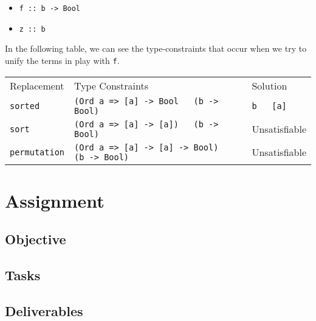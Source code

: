 \documentclass[a4paper, 11pt]{article}
\newcommand{\h}[1]{\texttt{#1}}
\begin{document}
\begin{itemize}
  \item \h{f :: b -> Bool}
  \item \h{z :: b}
\end{itemize}

In the following table, we can see the type-constraints that occur when we try to unify the terms in play with \h{f}.

\begin{tabular}{lll}
  Replacement & Type Constraints & Solution \\
  \h{sorted} & \h{(Ord a => [a] -> Bool ~ (b -> Bool)} & \h{b ~ [a]} \\
  \h{sort} & \h{(Ord a => [a] -> [a]) ~ (b -> Bool)} & Unsatisfiable \\
  \h{permutation} & \h{(Ord a => [a] -> [a] -> Bool) ~ (b -> Bool)} & Unsatisfiable \\
\end{tabular}

\section{Assignment}
\subsection{Objective}

\subsection{Tasks}


\subsection{Deliverables}



\end{document}
